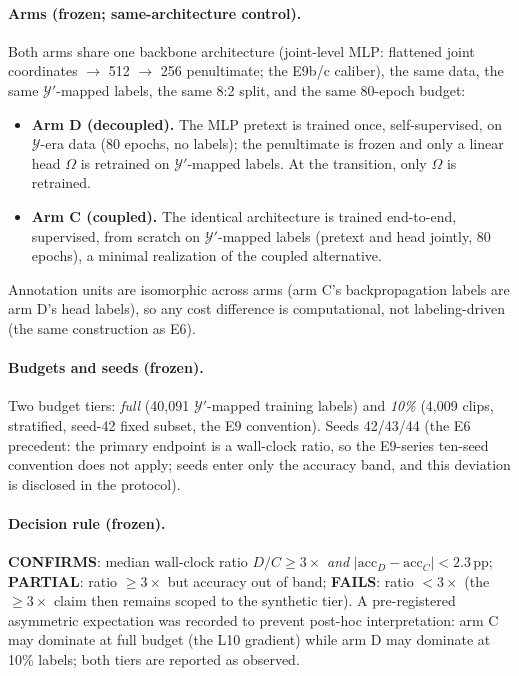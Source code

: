 \documentclass[11pt,a4paper]{article}
\begin{document}
\paragraph{Arms (frozen; same-architecture control).}
Both arms share one backbone architecture (joint-level MLP: flattened joint coordinates $\to$ 512 $\to$ 256 penultimate; the E9b/c caliber), the same data, the same $\mathcal{Y}'$-mapped labels, the same 8:2 split, and the same 80-epoch budget:
\begin{itemize}
\item \textbf{Arm D (decoupled).} The MLP pretext is trained once, self-supervised, on $\mathcal{Y}$-era data (80 epochs, no labels); the penultimate is frozen and only a linear head $\Omega$ is retrained on $\mathcal{Y}'$-mapped labels. At the transition, only $\Omega$ is retrained.
\item \textbf{Arm C (coupled).} The identical architecture is trained end-to-end, supervised, from scratch on $\mathcal{Y}'$-mapped labels (pretext and head jointly, 80 epochs), a minimal realization of the coupled alternative.
\end{itemize}
Annotation units are isomorphic across arms (arm C's backpropagation labels are arm D's head labels), so any cost difference is computational, not labeling-driven (the same construction as E6).

\paragraph{Budgets and seeds (frozen).}
Two budget tiers: \emph{full} (40{,}091 $\mathcal{Y}'$-mapped training labels) and \emph{10\%} (4{,}009 clips, stratified, seed-42 fixed subset, the E9 convention). Seeds 42/43/44 (the E6 precedent: the primary endpoint is a wall-clock ratio, so the E9-series ten-seed convention does not apply; seeds enter only the accuracy band, and this deviation is disclosed in the protocol).

\paragraph{Decision rule (frozen).}
\textbf{CONFIRMS}: median wall-clock ratio $D/C \geq 3\times$ \emph{and} $|\mathrm{acc}_D - \mathrm{acc}_C| < 2.3$\,pp; \textbf{PARTIAL}: ratio $\geq 3\times$ but accuracy out of band; \textbf{FAILS}: ratio $< 3\times$ (the $\geq 3\times$ claim then remains scoped to the synthetic tier). A pre-registered asymmetric expectation was recorded to prevent post-hoc interpretation: arm C may dominate at full budget (the L10 gradient) while arm D may dominate at 10\% labels; both tiers are reported as observed.
\end{document}
